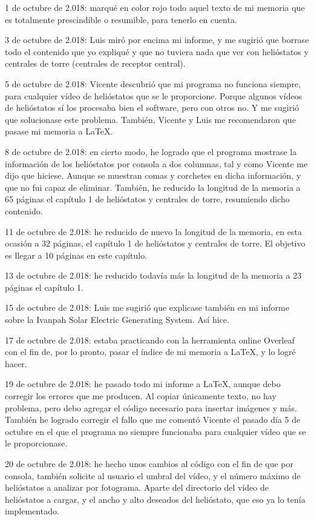 1 de octubre de 2.018: marqué en color rojo todo aquel texto de mi memoria que es totalmente prescindible o resumible, para tenerlo en cuenta.

3 de octubre de 2.018: Luis miró por encima mi informe, y me sugirió que borrase todo el contenido que yo expliqué y que no tuviera nada que ver con helióstatos y centrales de torre (centrales de receptor central).

5 de octubre de 2.018: Vicente descubrió que mi programa no funciona siempre, para cualquier vídeo de helióstatos que se le proporcione. Porque algunos vídeos de helióstatos sí los procesaba bien el software, pero con otros no. Y me sugirió que solucionase este problema. También, Vicente y Luis me recomendaron que pasase mi memoria a LaTeX.

8 de octubre de 2.018: en cierto modo, he logrado que el programa mostrase la información de los helióstatos por consola a dos columnas, tal y como Vicente me dijo que hiciese. Aunque se muestran comas y corchetes en dicha información, y que no fui capaz de eliminar. También, he reducido la longitud de la memoria a 65 páginas el capítulo 1 de helióstatos y centrales de torre, resumiendo dicho contenido.

11 de octubre de 2.018: he reducido de nuevo la longitud de la memoria, en esta ocasión a 32 páginas, el capítulo 1 de helióstatos y centrales de torre. El objetivo es llegar a 10 páginas en este capítulo.

13 de octubre de 2.018: he reducido todavía más la longitud de la memoria a 23 páginas el capítulo 1.

15 de octubre de 2.018: Luis me sugirió que explicase también en mi informe sobre la Ivanpah Solar Electric Generating System. Así hice.

17 de octubre de 2.018: estaba practicando con la herramienta online Overleaf con el fin de, por lo pronto, pasar el índice de mi memoria a LaTeX, y lo logré hacer.

19 de octubre de 2.018: he pasado todo mi informe a LaTeX, aunque debo corregir los errores que me producen. Al copiar únicamente texto, no hay problema, pero debo agregar el código necesario para insertar imágenes y más. También he logrado corregir el fallo que me comentó Vicente el pasado día 5 de octubre en el que el programa no siempre funcionaba para cualquier vídeo que se le proporcionase.

20 de octubre de 2.018: he hecho unos cambios al código con el fin de que por consola, también solicite al usuario el umbral del vídeo, y el número máximo de helióstatos a analizar por fotograma. Aparte del directorio del vídeo de helióstatos a cargar, y el ancho y alto deseados del helióstato, que eso ya lo tenía implementado.

